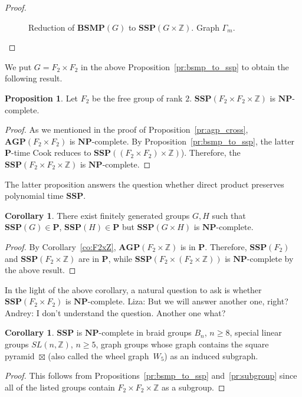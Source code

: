 \documentclass[10pt]{amsart}
\newcommand{\an}{\noindent\color{red} Andrey: }{}
\newcommand{\li}{\noindent\color{blue} Liza: }{}
\theoremstyle{definition}
\newtheorem{proposition}[theorem]{Proposition}
\newtheorem{corollary}[theorem]{Corollary}
\def\P{{\mathbf{P}}}
\def\NP{{\mathbf{NP}}}
\def\SSP{{\mathbf{SSP}}}
\def\BSMP{{\mathbf{BSMP}}}
\def\AGP{{\mathbf{AGP}}}
\begin{document}
\begin{proof}
\begin{figure}[h]
 \caption{Reduction of $\BSMP(G)$ to $\SSP(G\times \mathbb Z)$. Graph $\Gamma_m$.} \label{fi:bsmp_to_ssp}
\end{figure}
\end{proof}

We put $G=F_2\times F_2$ in the above Proposition~\ref{pr:bsmp_to_ssp} to obtain the following result.
\begin{proposition}\label{pr:ssp_cross}
Let $F_2$ be the free group of rank $2$. $\SSP(F_2\times F_2\times \mathbb Z)$ is $\NP$-complete.
\end{proposition}
\begin{proof}
As we mentioned in the proof of Proposition~\ref{pr:agp_cross}, $\AGP(F_2\times F_2)$ is $\NP$-complete. By Proposition~\ref{pr:bsmp_to_ssp}, the latter $\P$-time Cook reduces to $\SSP((F_2\times F_2)\times\mathbb Z)$). Therefore, the $\SSP(F_2\times F_2\times \mathbb Z)$ is $\NP$-complete.
\end{proof}

The latter proposition answers the question whether direct product preserves polynomial time $\SSP$.

\begin{corollary}\label{cor:NP_complete_ssp_cross}
There exist finitely generated groups $G,H$ such that $\SSP(G)\in\P$, $\SSP(H)\in\P$ but $\SSP(G\times H)$ is $\NP$-complete.
\end{corollary}
\begin{proof}
By Corollary~\ref{co:F2xZ}, $\AGP(F_2\times\mathbb Z)$ is in $\P$. Therefore, $\SSP(F_2)$ and $\SSP(F_2\times\mathbb Z)$ are in $\P$, while
$\SSP(F_2\times (F_2\times \mathbb Z))$ is $\NP$-complete by the above result.
\end{proof}
In the light of the above corollary, a natural question to ask is whether $\SSP(F_2\times F_2)$ is $\NP$-complete.
{\li{But we will answer another one, right?}} {\an I don't understand the question. Another one what?}

\begin{corollary}
$\SSP$ is $\NP$-complete in braid groups $B_n$, $n\ge 8$, special linear groups $SL(n,\mathbb Z)$, $n\ge 5$, graph groups whose graph contains the square pyramid~$\boxtimes$ (also called the wheel graph~$W_5$) as an induced subgraph.
\end{corollary}
\begin{proof}
This follows from Propositions~\ref{pr:bsmp_to_ssp} and~\ref{pr:subgroup} since all of the listed groups contain $F_2\times F_2\times \mathbb Z$ as a subgroup.
\end{proof}
\end{document}

